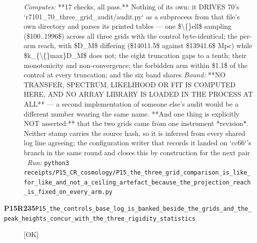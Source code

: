 \begin{description}
\emph{Computes:} **17 checks, all pass.** Nothing of its own: it DRIVES 70's `r7101\_70\_three\_grid\_audit/audit.py` as a subprocess from that file's own directory and parses its printed tables --- one \$\textbackslash\{\}ell\$ sampling (\$100..1996\$) across all three grids with the control byte-identical; the per-arm reach, with \$D\_M\$ differing (\$14011.5\$ against \$13941.6\$ Mpc) while \$k\_\{\textbackslash\{\}max\}D\_M\$ does not; the eight truncation gaps to a tenth; their monotonicity and non-convergence; the forbidden arm within \$1.1\$ of the control at every truncation; and the six band shares
 \emph{Bound:}  **NO TRANSFER, SPECTRUM, LIKELIHOOD OR FIT IS COMPUTED HERE, AND NO ARRAY LIBRARY IS LOADED IN THE PROCESS AT ALL** --- a second implementation of someone else's audit would be a different number wearing the same name.  **And one thing is explicitly NOT asserted:** that the two grids came from one instrument *revision*. Neither stamp carries the source hash, so it is inferred from every shared log line agreeing; the configuration writer that records it landed on `cc66`'s branch in the same round and closes this by construction for the next pair
\ \emph{Run:} \texttt{python3 receipts/P15\_CR\_cosmology/P15\_the\_three\_grid\_comparison\_is\_like\_for\_like\_and\_not\_a\_ceiling\_artefact\_because\_the\_projection\_reach\_is\_fixed\_on\_every\_arm.py}
\item[\rcptlabel{P15_the_controls_base_log_is_banked_beside_the_grids_and_the_peak_heights_concur_with_the_three_rigidity_statistics}{P15R235}\textbf{P15R235}\quad\texttt{P15\_the\_controls\_base\_log\_is\_banked\_beside\_the\_grids\_and\_the\_peak\_heights\_concur\_with\_the\_three\_rigidity\_statistics}]\hfill\textsf{[OK]}\\

\end{description}
